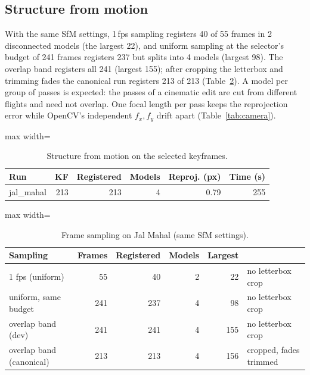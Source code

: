 \subsection{Structure from motion}

With the same SfM settings, 1\,fps sampling registers 40 of 55 frames in 2 disconnected models (the largest 22), and uniform sampling at the selector's budget of 241 frames registers 237 but splits into 4 models (largest 98). The overlap band registers all 241 (largest 155); after cropping the letterbox and trimming fades the canonical run registers 213 of 213 (Table~\ref{tab:sampling}). A model per group of passes is expected: the passes of a cinematic edit are cut from different flights and need not overlap. One focal length per pass keeps the reprojection error while OpenCV's independent $f_x,f_y$ drift apart (Table~\ref{tab:camera}).

\begin{table}[htbp]
\centering\small
\caption{Structure from motion on the selected keyframes.}\label{tab:sfm}
\begin{adjustbox}{max width=\linewidth}
\begin{tabular}{lrrrrr}
\toprule
Run & KF & Registered & Models & Reproj. (px) & Time (s) \\
\midrule
jal\_mahal & 213 & 213 & 4 & 0.79 & 255 \\
\bottomrule
\end{tabular}
\end{adjustbox}
\end{table}

\begin{table}[htbp]
\centering\small
\caption{Frame sampling on Jal Mahal (same SfM settings).}\label{tab:sampling}
\begin{adjustbox}{max width=\linewidth}
\begin{tabular}{lrrrrl}
\toprule
Sampling & Frames & Registered & Models & Largest &  \\
\midrule
1 fps (uniform) & 55 & 40 & 2 & 22 & no letterbox crop \\
uniform, same budget & 241 & 237 & 4 & 98 & no letterbox crop \\
overlap band (dev) & 241 & 241 & 4 & 155 & no letterbox crop \\
overlap band (canonical) & 213 & 213 & 4 & 156 & cropped, fades trimmed \\
\bottomrule
\end{tabular}
\end{adjustbox}
\end{table}

